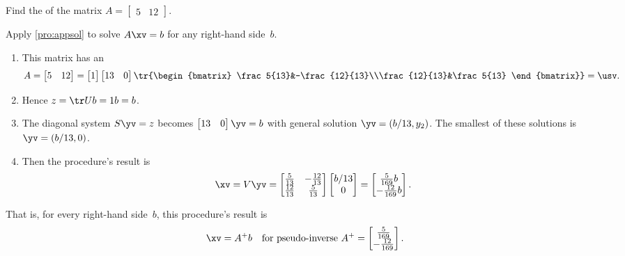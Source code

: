 \begin{example} 
Find the  of the matrix \(A=\begin{bmatrix} 5&12 \end{bmatrix}\).
\begin{solution} 
Apply \cref{pro:appsol} to solve \(A\xv=b\) for any right-hand side~\(b\).
\begin{enumerate}
\item This matrix has an \svd\ 
\begin{equation*}
A=\begin{bmatrix} 5&12 \end{bmatrix}
=\begin{bmatrix} 1 \end{bmatrix}
\begin{bmatrix} 13& 0 \end{bmatrix}
\tr{\begin{bmatrix} \frac5{13}&-\frac{12}{13}\\\frac{12}{13}&\frac5{13} \end{bmatrix}}
=\usv.
\end{equation*}

\item Hence \(z=\tr Ub=1b=b\).
\item The diagonal system \(S\yv=z\) becomes \(\begin{bmatrix} 13&0 \end{bmatrix}\yv=b\) with general solution \(\yv=(b/13,y_2)\).
The smallest of these solutions is \(\yv=(b/13,0)\).
\item Then the procedure's result is 
\begin{equation*}
\xv=V\yv=\begin{bmatrix} \frac5{13}&-\frac{12}{13}\\\frac{12}{13}&\frac5{13} \end{bmatrix}\begin{bmatrix} b/13\\0 \end{bmatrix}
=\begin{bmatrix} \frac5{169}b\\-\frac{12}{169}b \end{bmatrix}.
\end{equation*}

\end{enumerate}
That is, for every right-hand side~\(b\), this procedure's result is
\begin{equation*}
\xv=A^+b\quad\text{for pseudo-inverse }A^+=\begin{bmatrix} \frac5{169}\\-\frac{12}{169} \end{bmatrix}.
\end{equation*}
\end{solution}
\end{example}




